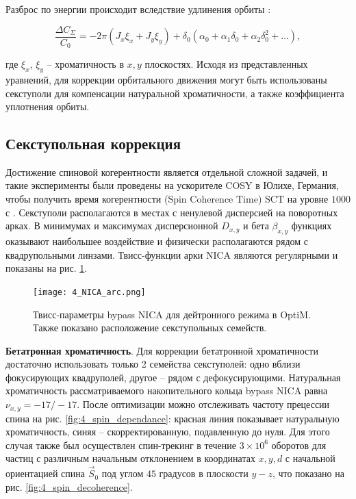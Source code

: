 \par Разброс по энергии происходит вследствие удлинения орбиты \cite{orbit_length}:

\begin{equation}
\frac{\Delta C_\Sigma}{C_{0}}
=-2\pi\left(J_x\xi_x+J_y\xi_y\right)+\delta_0\left(\alpha_0+\alpha_1\delta_0+\alpha_2\delta_0^2+\ldots\right),
\label{eq:orbit_length}
\end{equation}

\noindent где $\xi_x$, $\xi_y$ – хроматичность в $x, y$ плоскостях. Исходя из представленных уравнений, для коррекции орбитального движения могут быть использованы секступоли для компенсации натуральной хроматичности, а также коэффициента уплотнения орбиты.

		\subsection{Секступольная коррекция}\label{sec:EDM/Wien_filter_tracking/sextupole_correction}

\par Достижение спиновой когерентности является отдельной сложной задачей, и такие эксперименты были проведены на ускорителе COSY в Юлихе, Германия, чтобы получить время когерентности (Spin Coherence Time) SCT на уровне $1000$ с \cite{1000}. Секступоли располагаются в местах с ненулевой дисперсией на поворотных арках. В минимумах и максимумах дисперсионной $D_{x,y}$ и бета $\beta_{x,y}$ функциях оказывают наибольшее воздействие и физически располагаются рядом с квадрупольными линзами. Твисс-функции арки NICA являются регулярными и показаны на рис. \ref{fig:4_NICA_arc}.

\begin{figure}[!h]
  \centering
   \texttt{[image: 4\_NICA\_arc.png]}
   \caption{Твисс-параметры bypass NICA для дейтронного режима в OptiM. Также показано расположение секступольных семейств.}
   \label{fig:4_NICA_arc}
\end{figure}

\textbf{Бетатронная хроматичность}.
Для коррекции бетатронной хроматичности достаточно использовать только 2 семейства секступолей: одно вблизи фокусирующих квадруполей, другое – рядом с дефокусирующими. Натуральная хроматичность рассматриваемого накопительного кольца bypass NICA равна $\nu_{x,y}=-17/-17$. После оптимизации можно отслеживать частоту прецессии спина на рис. \ref{fig:4_spin_dependance}: красная линия показывает натуральную хроматичность, синяя – скорректированную, подавленную до нуля. Для этого случая также был осуществлен спин-трекинг в течение $3\times{10}^6$ оборотов для частиц с различным начальным отклонением в координатах $x, y, d$ с начальной ориентацией спина ${\vec{S}}_0$ под углом $45$ градусов в плоскости $y-z$, что показано на рис. \ref{fig:4_spin_decoherence}.

